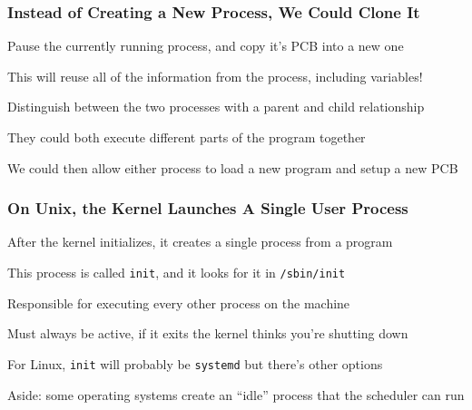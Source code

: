   \begin{frame}
    \frametitle{Instead of Creating a New Process, We Could Clone It}

    Pause the currently running process, and copy it's PCB into a new one

    \hspace{2em} This will reuse all of the information from the process,
    including variables!

    \vspace{2em}

    Distinguish between the two processes with a parent and child relationship

    \hspace{2em} They could both execute different parts of the program together

    \vspace{4em}

    We could then allow either process to load a new program and setup a new PCB
  \end{frame}

  \begin{frame}
    \frametitle{On Unix, the Kernel Launches A Single User Process}

    After the kernel initializes, it creates a single process
    from a program

    \vspace{2em}

    This process is called \texttt{init}, and it looks for it in \texttt{/sbin/init}

    \hspace{2em} Responsible for executing every other process on the machine

    \hspace{2em} Must always be active, if it exits the kernel thinks you're shutting down

    \vspace{2em}

    For Linux, \texttt{init} will probably be \texttt{systemd} but there's other options

    \vspace{2em}

    Aside: some operating systems create an ``idle'' process that the
    scheduler can run
  \end{frame}

